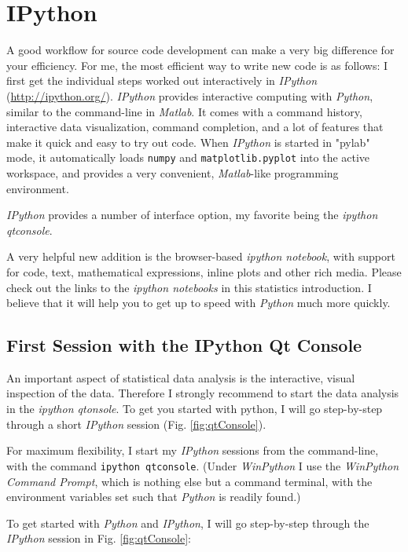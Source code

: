 \section{IPython}

A good workflow for source code development can make a very big difference for your efficiency. For me, the most efficient way to write new code is as follows: I first get the individual steps worked out interactively in \emph{\Gls{IPython}} (\url{http://ipython.org/}). \emph{IPython }provides interactive computing with \emph{Python}, similar to the command-line in \emph{Matlab}. It comes with a command history, interactive data visualization, command completion, and a lot of features that make it quick and easy to try out code. When \emph{IPython} is started in "\gls{pylab}" mode, it automatically loads \lstinline{numpy} and \lstinline{matplotlib.pyplot} into the active workspace, and provides a very convenient, \emph{Matlab}-like programming environment.

\emph{IPython} provides a number of interface option, my favorite being the \emph{ipython qtconsole}.

A very helpful new addition is the browser-based \emph{ipython notebook}, with support for code, text, mathematical expressions, inline plots and other rich media. Please check out the links to the \emph{ipython
notebooks} in this statistics introduction. I believe that it will  help you to get up to speed with \emph{Python} much more quickly.

\subsection{First Session with the IPython Qt Console}

An important aspect of statistical data analysis is the interactive, visual inspection of the data. Therefore I strongly recommend to start the data analysis in the \emph{ipython qtonsole}. To get you started with python, I will go step-by-step through a short \emph{IPython} session (Fig. \ref{fig:qtConsole}).

For maximum flexibility, I start my \emph{IPython} sessions from the command-line, with the command \lstinline{ipython qtconsole}. (Under \emph{WinPython} I use the \emph{WinPython Command Prompt}, which is nothing else but a command terminal, with the environment variables set such that \emph{Python} is readily found.)

To get started with \emph{Python} and \emph{IPython}, I will go step-by-step through the \emph{IPython} session in Fig. \ref{fig:qtConsole}:

